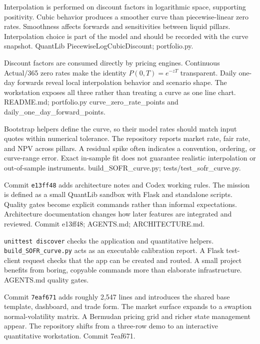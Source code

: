 {Interpolation is performed on discount factors in logarithmic space, supporting positivity.}
{Cubic behavior produces a smoother curve than piecewise-linear zero rates.}
{Smoothness affects forwards and sensitivities between liquid pillars.}
{Interpolation choice is part of the model and should be recorded with the curve snapshot.}
{QuantLib PiecewiseLogCubicDiscount; portfolio.py.}

{Discount factors are consumed directly by pricing engines.}
{Continuous Actual/365 zero rates make the identity $P(0,T)=e^{-zT}$ transparent.}
{Daily one-day forwards reveal local interpolation behavior and scenario shape.}
{The workstation exposes all three rather than treating a curve as one line chart.}
{README.md; portfolio.py curve\_zero\_rate\_points and daily\_one\_day\_forward\_points.}

{Bootstrap helpers define the curve, so their model rates should match input quotes within numerical tolerance.}
{The repository reports market rate, fair rate, and NPV across pillars.}
{A residual spike often indicates a convention, ordering, or curve-range error.}
{Exact in-sample fit does not guarantee realistic interpolation or out-of-sample instruments.}
{build\_SOFR\_curve.py; tests/test\_sofr\_curve.py.}

{Commit \texttt{e13ff48} adds architecture notes and Codex working rules.}
{The mission is defined as a small QuantLib sandbox with Flask and standalone scripts.}
{Quality gates become explicit commands rather than informal expectations.}
{Architecture documentation changes how later features are integrated and reviewed.}
{Commit e13ff48; AGENTS.md; ARCHITECTURE.md.}

{\texttt{unittest discover} checks the application and quantitative helpers.}
{\texttt{build\_SOFR\_curve.py} acts as an executable calibration report.}
{A Flask test-client request checks that the app can be created and routed.}
{A small project benefits from boring, copyable commands more than elaborate infrastructure.}
{AGENTS.md quality gates.}

{Commit \texttt{7eaf671} adds roughly 2,547 lines and introduces the shared base template, dashboard, and trade form.}
{The market surface expands to a swaption normal-volatility matrix.}
{A Bermudan pricing grid and richer state management appear.}
{The repository shifts from a three-row demo to an interactive quantitative workstation.}
{Commit 7eaf671.}

